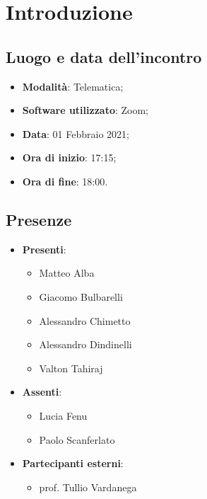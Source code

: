 \documentclass[]{article}
\begin{document}
	

	\newpage


	\section{Introduzione}
		\subsection{Luogo e data dell'incontro}
		\begin{itemize}
			\item \textbf{Modalità}: Telematica;
			\item \textbf{Software utilizzato}: Zoom;
			\item \textbf{Data}: 01 Febbraio 2021;
			\item \textbf{Ora di inizio}: 17:15;
			\item \textbf{Ora di fine}: 18:00.
		\end{itemize}

		\subsection{Presenze}
		\begin{itemize}
			\item \textbf{Presenti}:
			\begin{itemize}
				\item Matteo Alba
				\item Giacomo Bulbarelli
				\item Alessandro Chimetto
				\item Alessandro Dindinelli
				\item Valton Tahiraj
			\end{itemize}
			\item \textbf{Assenti}:
			\begin{itemize}
				\item Lucia Fenu
				\item Paolo Scanferlato
			\end{itemize}
			\item \textbf{Partecipanti esterni}:
			\begin{itemize}
				\item prof. Tullio Vardanega
			\end{itemize}
		\end{itemize}
\end{document}
